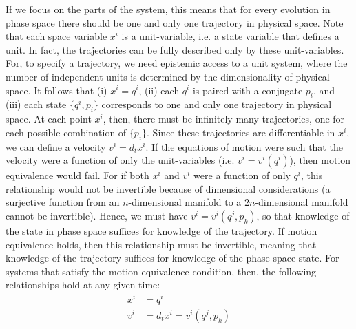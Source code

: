 \documentclass[letterpaper]{article}
\begin{document}
If we focus on the parts of the system, this means that for every evolution in phase space there should be one and only one trajectory in physical space. Note that each space variable $x^i$ is a unit-variable, i.e. a state variable that defines a unit. In fact, the trajectories can be fully described only by these unit-variables. For, to specify a trajectory, we need epistemic access to a unit system, where the number of independent units is determined by the dimensionality of physical space. It follows that (i) $x^i = q^i$, (ii) each $q^i$ is paired with a conjugate $p_i$, and (iii) each state $\{q^i, p_i\}$ corresponds to one and only one trajectory in physical space. At each point $x^i$, then, there must be infinitely many trajectories, one for each possible combination of $\{p_i\}$. Since these trajectories are differentiable in $x^i$, we can define a velocity $v^i = d_t x^i$. If the equations of motion were such that the velocity were a function of only the unit-variables (i.e. $v^i=v^i(q^i)$), then motion equivalence would fail. For if both $x^i$ and $v^i$ were a function of only $q^i$, this relationship would not be invertible because of dimensional considerations (a surjective function from an $n$-dimensional manifold to a $2n$-dimensional manifold cannot be invertible). Hence, we must have $v^i=v^i(q^j, p_k)$, so that knowledge of the state in phase space suffices for knowledge of the trajectory. If motion equivalence holds, then this relationship must be invertible, meaning that knowledge of the trajectory suffices for knowledge of the phase space state. For systems that satisfy the motion equivalence condition, then, the following relationships hold at any given time:
\begin{equation}\label{weak_equivalence}
\begin{aligned}
x^i &= q^i \\
v^i &= d_t x^i = v^i(q^j, p_k)
\end{aligned}
\end{equation}
\end{document}
